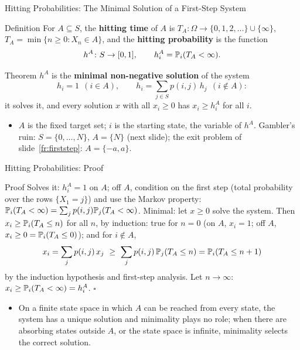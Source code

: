 \begin{frame}{Hitting Probabilities: The Minimal Solution of a First-Step System}
  \label{fr:hitting}
  \small
  \begin{block}{Definition}
    For $A\subseteq S$, the \textbf{hitting time} of $A$ is $T_A\colon\Omega\to\{0,1,2,\dots\}\cup\{\infty\}$, $T_A=\min\{n\ge0 : X_n\in A\}$, and the \textbf{hitting probability} is the function
    \[
      h^A\colon S\to[0,1],\qquad h^A_i=\mathbb{P}_i(T_A<\infty).
    \]
  \end{block}
  \begin{block}{Theorem}
    $h^A$ is the \textbf{minimal non-negative solution} of the system
    \[
      h_i=1\ \ (i\in A),\qquad h_i=\sum_{j\in S}p(i,j)\,h_j\ \ (i\notin A):
    \]
    it solves it, and every solution $x$ with all $x_i\ge0$ has $x_i\ge h^A_i$ for all $i$.
  \end{block}
  \begin{itemize}
    \item $A$ is the fixed target set; $i$ is the starting state, the variable of $h^A$. Gambler's ruin: $S=\{0,\dots,N\}$, $A=\{N\}$ (next slide); the exit problem of slide~\ref{fr:firststep}: $A=\{-a,a\}$.
  \end{itemize}
\end{frame}

\begin{frame}{Hitting Probabilities: Proof}
  \label{fr:hittingproof}
  \small
  \begin{block}{Proof}
    Solves it: $h^A_i=1$ on $A$; off $A$, condition on the first step (total probability over the rows $\{X_1=j\}$) and use the Markov property: $\mathbb{P}_i(T_A<\infty)=\sum_jp(i,j)\mathbb{P}_j(T_A<\infty)$.
    Minimal: let $x\ge0$ solve the system. Then $x_i\ge\mathbb{P}_i(T_A\le n)$ for all $n$, by induction: true for $n=0$ (on $A$, $x_i=1$; off $A$, $x_i\ge0=\mathbb{P}_i(T_A\le0)$); and for $i\notin A$,
    \[
      x_i=\sum_jp(i,j)\,x_j\ \ge\ \sum_jp(i,j)\,\Prob_j(T_A\le n)=\Prob_i(T_A\le n+1)
    \]
    by the induction hypothesis and first-step analysis. Let $n\to\infty$: $x_i\ge\mathbb{P}_i(T_A<\infty)=h^A_i$. \hfill$\square$
  \end{block}
  \begin{itemize}
    \item On a finite state space in which $A$ can be reached from every state, the system has a unique solution and minimality plays no role; when there are absorbing states outside $A$, or the state space is infinite, minimality selects the correct solution.
  \end{itemize}
\end{frame}

